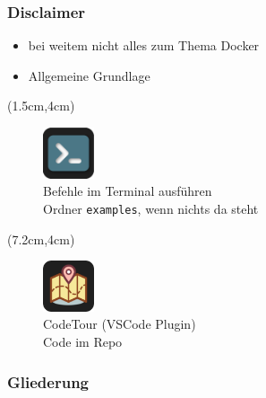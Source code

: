 \documentclass[22pt]{beamer}
\newcommand{\code}[1]{\colorbox{gray!15}{\texttt{#1}}}
\begin{document}
\begin{frame}[t]
    \frametitle{Disclaimer}
    \begin{itemize}
        \item bei weitem nicht alles zum Thema Docker
        \item Allgemeine Grundlage
    \end{itemize}

    \begin{textblock*}{4.5cm}(1.5cm,4cm) %
        \begin{figure}
            \includegraphics[width=1.5cm]{Bilder/terminal2.png}
            \captionsetup{justification=centering}
            \caption*{Befehle im Terminal ausführen\\ Ordner \code{examples}, wenn nichts da steht}
        \end{figure}

    \end{textblock*}

    \begin{textblock*}{4.5cm}(7.2cm,4cm) %
        \begin{figure}
            \includegraphics[width=1.5cm]{Bilder/CodeTour.png}
            \centering
            \captionsetup{justification=centering}
            \caption*{CodeTour (VSCode Plugin)\\Code im Repo}
        \end{figure}
    \end{textblock*}

\end{frame}

\begin{frame}[plain]
    \frametitle{Gliederung}
    \tableofcontents
\end{frame}
\end{document}
